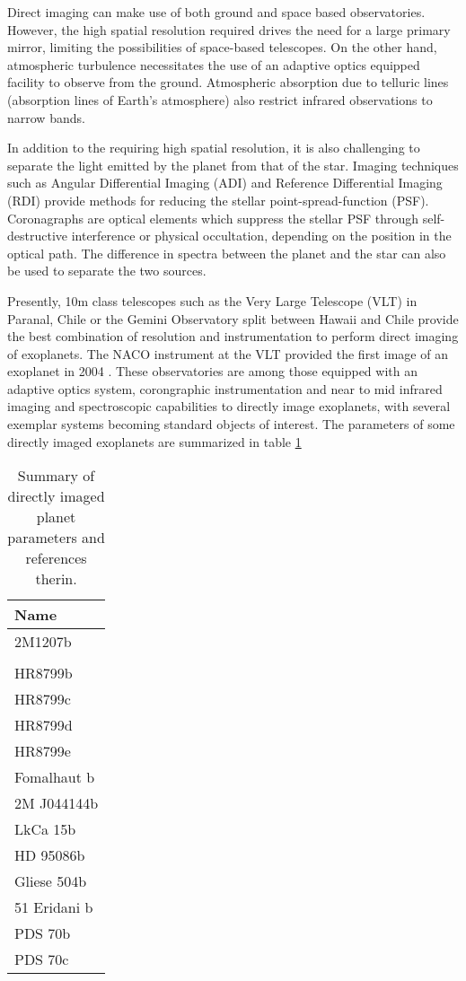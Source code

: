 Direct imaging can make use of both ground and space based observatories. 
However, the high spatial resolution required drives the need for a large primary mirror, limiting the possibilities of space-based telescopes. On the other hand, atmospheric turbulence necessitates the use of an adaptive optics equipped facility to observe from the ground. 
Atmospheric absorption due to telluric lines (absorption lines of Earth's atmosphere) also restrict infrared observations to narrow bands.

In addition to the requiring high spatial resolution, it is also challenging to separate the light emitted by the planet from that of the star.
Imaging techniques such as Angular Differential Imaging (ADI) \autocite{Marois2007} and Reference Differential Imaging (RDI) \autocite{Lefreniere2009,Soummer2012} provide methods for reducing the stellar point-spread-function (PSF). 
Coronagraphs are optical elements which suppress the stellar PSF through self-destructive interference or physical occultation, depending on the position in the optical path.
The difference in spectra between the planet and the star can also be used to separate the two sources.
 
Presently, 10m class telescopes such as the Very Large Telescope (VLT) in Paranal, Chile or the Gemini Observatory split between Hawaii and Chile provide the best combination of resolution and instrumentation to perform direct imaging of exoplanets.
The NACO instrument at the VLT provided the first image of an exoplanet in 2004 \autocite{Chauvin2004}.
These observatories are among those equipped with an adaptive optics system, corongraphic instrumentation and near to mid infrared imaging and spectroscopic capabilities to directly image exoplanets, with several exemplar systems becoming standard objects of interest. 
The parameters of some directly imaged exoplanets are summarized in table \ref{tab:exoplanetparams}
\begin{table}[t]
	\begin{tabular}{l}
		\toprule
		Name \\
		\midrule
		2M1207b\\
		\bpic\\
		HR8799b\\
		HR8799c\\
		HR8799d\\
		HR8799e\\
		Fomalhaut b\\
		2M J044144b\\
		LkCa 15b\\
		HD 95086b\\
		Gliese 504b\\
		51 Eridani b\\
		PDS 70b\\
		PDS 70c\\
		\bottomrule
	\end{tabular}
	\caption{Summary of directly imaged planet parameters \cite{Bowler2016} and references therin.}
	\label{tab:exoplanetparams}
\end{table}


